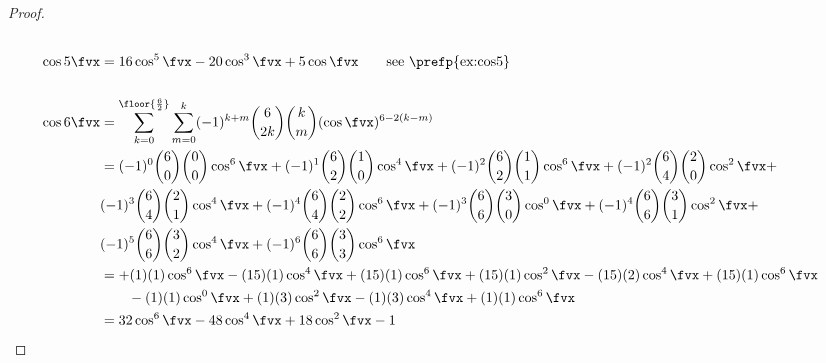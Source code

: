 \begin{proof}
\begin{align*}
\\
  \cos5\fvx
  &= 16\cos^5\fvx -20\cos^3\fvx + 5\cos\fvx \qquad\text{see \prefp{ex:cos5}} 
\\
\\
  \cos6\fvx
    &= \sum_{k=0}^\floor{\frac{6}{2}}\sum_{m=0}^k      
         (-1)^{k+m} {6\choose 2k  }{k\choose m}(\cos\fvx)^{6-2(k-m)}
  \\&= (-1)^0 {6\choose0}{0\choose0}\cos^6\fvx +    %
       (-1)^1 {6\choose2}{1\choose0}\cos^4\fvx +    %
       (-1)^2 {6\choose2}{1\choose1}\cos^6\fvx +    %
       (-1)^2 {6\choose4}{2\choose0}\cos^2\fvx +    %
   \\&
       (-1)^3 {6\choose4}{2\choose1}\cos^4\fvx +    %
       (-1)^4 {6\choose4}{2\choose2}\cos^6\fvx +    %
       (-1)^3 {6\choose6}{3\choose0}\cos^0\fvx +    %
       (-1)^4 {6\choose6}{3\choose1}\cos^2\fvx +    %
   \\&
       (-1)^5 {6\choose6}{3\choose2}\cos^4\fvx +    %
       (-1)^6 {6\choose6}{3\choose3}\cos^6\fvx      %
  \\&= +( 1)(1)\cos^6\fvx      %
       -(15)(1)\cos^4\fvx      %
       +(15)(1)\cos^6\fvx      %
       +(15)(1)\cos^2\fvx      %
       -(15)(2)\cos^4\fvx      %
       +(15)(1)\cos^6\fvx      %
  \\&\qquad
       -(1)(1)\cos^0\fvx       %
       +(1)(3)\cos^2\fvx       %
       -(1)(3)\cos^4\fvx       %
       +(1)(1)\cos^6\fvx       %
  \\&= 32\cos^6\fvx -48\cos^4\fvx +18\cos^2\fvx -1

\end{align*}
\end{proof}
